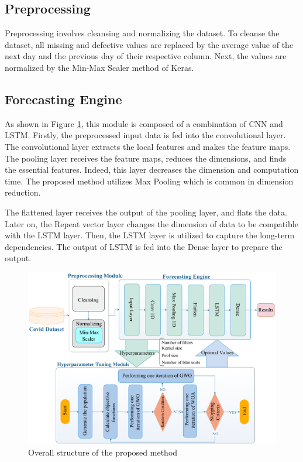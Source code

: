 \documentclass{article}
\begin{document}
\subsection{Preprocessing}

Preprocessing involves cleansing and normalizing the dataset. To cleanse the dataset, all missing and defective values are replaced by the average value of the next day and the previous day of their respective column. Next, the values are normalized by the Min-Max Scaler method of Keras.

\subsection{Forecasting Engine}
As shown in Figure \ref{figOveall}, this module is composed of a combination of CNN and LSTM. Firstly, the preprocessed input data is fed into the convolutional layer. The convolutional layer extracts the local features and makes the feature maps. The pooling layer receives the feature maps, reduces the dimensions, and finds the essential features. Indeed, this layer decreases the dimension and computation time. The proposed method utilizes Max Pooling which is common in dimension reduction.

The flattened layer receives the output of the pooling layer, and flats the data. Later on, the Repeat vector layer changes the dimension of data to be compatible with the LSTM layer. Then, the LSTM layer is utilized to capture the long-term dependencies. The output of LSTM is fed into the Dense layer to prepare the output.
\begin{figure}[H]
	\centering
	\includegraphics [width=6.2 in] {proposed.pdf}
	\caption{Overall structure of the proposed method}
	\label{figOveall}
\end{figure}
\end{document}
